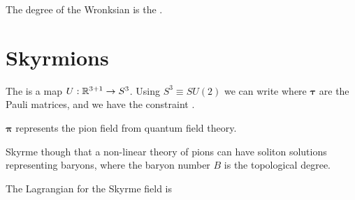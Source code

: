 \documentclass{article}
\begin{document}
\begin{prop}
The degree of the Wronksian is the . 
\end{prop}

\section{Skyrmions}

\begin{definition}
The  is a map $U : \mathbb{R}^{3+1} \to S^3$. Using $S^3 \equiv SU(2)$ we can write 
where $\bm{\tau}$ are the Pauli matrices, and we have the constraint 
. 
\end{definition}

\begin{fact}
$\bm{\pi}$ represents the pion field from quantum field theory. 
\end{fact}

\begin{idea}
Skyrme though that a non-linear theory of pions can have soliton solutions representing baryons, where the baryon number $B$ is the topological degree. 
\end{idea}

\begin{definition}
The Lagrangian for the Skyrme field is 
\end{definition}
\end{document}
